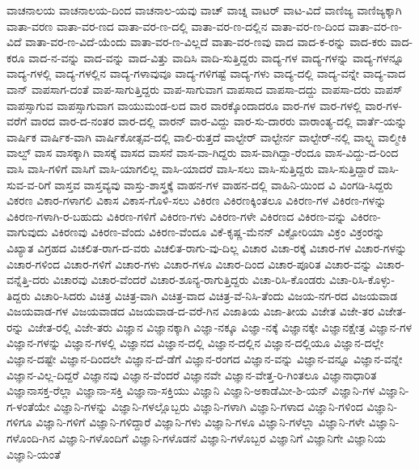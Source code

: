 {ವಾಚನಾಲಯ
ವಾಚನಾಲಯ-ದಿಂದ
ವಾಚನಾಲ-ಯವು
ವಾಚ್
ವಾಚ್ನ
ವಾಟರ್
ವಾಟ-ವಿದೆ
ವಾಣಿಜ್ಯ
ವಾಣಿಜ್ಯಕ್ಕಾಗಿ
ವಾತಾ-ವರಣ
ವಾತಾ-ವರ-ಣದ
ವಾತಾ-ವರ-ಣ-ದಲ್ಲಿ
ವಾತಾ-ವರ-ಣ-ದಲ್ಲಿನ
ವಾತಾ-ವರ-ಣ-ದಿಂದ
ವಾತಾ-ವರ-ಣ-ವಿದೆ
ವಾತಾ-ವರ-ಣ-ವಿದೆ-ಯೆಂದು
ವಾತಾ-ವರ-ಣ-ವಿಲ್ಲದೆ
ವಾತಾ-ವರ-ಣವು
ವಾದ
ವಾದ-ಕ-ರನ್ನು
ವಾದ-ಕರು
ವಾದ-ಕರೂ
ವಾದ-ನ-ವನ್ನು
ವಾದ-ವನ್ನು
ವಾದ-ವಿತ್ತು
ವಾದಿಸಿ
ವಾದಿ-ಸುತ್ತಿದ್ದರು
ವಾದ್ಯ-ಗಳ
ವಾದ್ಯ-ಗಳನ್ನು
ವಾದ್ಯ-ಗಳನ್ನೂ
ವಾದ್ಯ-ಗಳಲ್ಲಿ
ವಾದ್ಯ-ಗಳಲ್ಲಿನ
ವಾದ್ಯ-ಗಳಾವುವೂ
ವಾದ್ಯ-ಗಳಿಗಷ್ಟೆ
ವಾದ್ಯ-ಗಳು
ವಾದ್ಯ-ದಲ್ಲಿ
ವಾದ್ಯ-ವನ್ನೇ
ವಾದ್ಯ-ವಾದ
ವಾನ್
ವಾಪಸಾಗ-ದಂತೆ
ವಾಪ-ಸಾಗುತ್ತಿದ್ದರು
ವಾಪ-ಸಾಗುವಾಗ
ವಾಪಸಾದ
ವಾಪಸಾ-ದದ್ದು
ವಾಪಸಾ-ದರು
ವಾಪಸ್
ವಾಪಸ್ಸಾಗುವ
ವಾಪಸ್ಸಾಗುವಾಗ
ವಾಯುಮಂಡ-ಲದ
ವಾರ
ವಾರಕ್ಕೊಂದಾದರೂ
ವಾರ-ಗಳ
ವಾರ-ಗಳಲ್ಲಿ
ವಾರ-ಗಳ-ವರೆಗೆ
ವಾರದ
ವಾರ-ದ-ನಂತರ
ವಾರ-ದಲ್ಲಿ
ವಾರನ್
ವಾರ-ವಿದ್ದು
ವಾರ-ಸು-ದಾರರು
ವಾರಾಂತ್ಯ-ದಲ್ಲಿ
ವಾರ್ತೆ-ಯನ್ನು
ವಾರ್ಷಿಕ
ವಾರ್ಷಿಕ-ವಾಗಿ
ವಾರ್ಷಿಕೋತ್ಸವ-ದಲ್ಲಿ
ವಾಲಿ-ರುತ್ತದೆ
ವಾಲ್ಟೇರ್
ವಾಲ್ಟೇರ್ನ
ವಾಲ್ಟೇರ್-ನಲ್ಲಿ
ವಾಲ್ಟ್ನ
ವಾಲ್ಮೀಕಿ
ವಾಲ್ವ್
ವಾಸ
ವಾಸಕ್ಕಾಗಿ
ವಾಸಕ್ಕೆ
ವಾಸದ
ವಾಸನೆ
ವಾಸ-ವಾ-ಗಿದ್ದರು
ವಾಸ-ವಾಗಿದ್ದಾ-ರೆಂದೂ
ವಾಸ-ವಿದ್ದು-ದ-ರಿಂದ
ವಾಸಿ
ವಾಸಿ-ಗಳಿಗೆ
ವಾಸಿಗೆ
ವಾಸಿ-ಯಾಗಲಿಲ್ಲ
ವಾಸಿ-ಯಾದರೆ
ವಾಸಿ-ಸಲು
ವಾಸಿ-ಸುತ್ತಿದ್ದರು
ವಾಸಿ-ಸುತ್ತಿದ್ದಾರೆ
ವಾಸಿ-ಸುವ-ವ-ರಿಗೆ
ವಾಸ್ತವ
ವಾಸ್ತವ್ಯವು
ವಾಸ್ತು-ಶಾಸ್ತ್ರಕ್ಕೆ
ವಾಹನ-ಗಳ
ವಾಹನ-ದಲ್ಲಿ
ವಾಹಿನಿ-ಯಿಂದ
ವಿ
ವಿಂಗಡಿ-ಸಿದ್ದರು
ವಿಕರಣ
ವಿಕಾರ-ಗಳಾಗಲಿ
ವಿಕಾಸ
ವಿಕಾಸ-ಗೊಳಿ-ಸಲು
ವಿಕಿರಣ
ವಿಕಿರಣಕ್ಕಿಂತಲೂ
ವಿಕಿರಣ-ಗಳ
ವಿಕಿರಣ-ಗಳನ್ನು
ವಿಕಿರಣ-ಗಳಾಗಿ-ರ-ಬಹುದು
ವಿಕಿರಣ-ಗಳಿಗೆ
ವಿಕಿರಣ-ಗಳು
ವಿಕಿರಣ-ಗಳೇ
ವಿಕಿರಣದ
ವಿಕಿರಣ-ವನ್ನು
ವಿಕಿರಣ-ವಾಗುವುದು
ವಿಕಿರಣವು
ವಿಕಿರಣ-ವೆಂದು
ವಿಕಿರಣ-ವೆಂದೂ
ವಿಕೆ-ಕೃಷ್ಣ-ಮೆನನ್
ವಿಕ್ಟೋರಿಯಾ
ವಿಕ್ರಂ
ವಿಕ್ರಂರನ್ನು
ವಿಖ್ಯಾತ
ವಿಗ್ರಹದ
ವಿಚಲಿತ-ರಾಗ-ದ-ವರು
ವಿಚಲಿತ-ರಾಗು-ವು-ದಿಲ್ಲ
ವಿಚಾರ
ವಿಚಾ-ರಕ್ಕೆ
ವಿಚಾರ-ಗಳ
ವಿಚಾರ-ಗಳನ್ನು
ವಿಚಾರ-ಗಳಿಂದ
ವಿಚಾರ-ಗಳಿಗೆ
ವಿಚಾರ-ಗಳು
ವಿಚಾರ-ಗಳೂ
ವಿಚಾರ-ದಿಂದ
ವಿಚಾರ-ಪೂರಿತ
ವಿಚಾರ-ವನ್ನು
ವಿಚಾರ-ವನ್ನೆತ್ತಿ-ದರು
ವಿಚಾರವು
ವಿಚಾರ-ವೆಂದರೆ
ವಿಚಾರ-ಶೂನ್ಯ-ರಾಗುತ್ತಿದ್ದರು
ವಿಚಾ-ರಿಸಿ-ಕೊಂಡರು
ವಿಚಾ-ರಿಸಿ-ಕೊಳ್ಳು-ತಿದ್ದರು
ವಿಚಾರಿ-ಸಿದರು
ವಿಚಿತ್ರ
ವಿಚಿತ್ರ-ವಾಗಿ
ವಿಚಿತ್ರ-ವಾದ
ವಿಚಿತ್ರ-ವೆ-ನಿಸಿ-ತೆಂದು
ವಿಜಯ-ನಗ-ರದ
ವಿಜಯವಾಡ
ವಿಜಯವಾಡ-ಗಳ
ವಿಜಯವಾಡದ
ವಿಜಯವಾಡ-ದ-ವರೆ-ಗಿನ
ವಿಜಾತಿಯ
ವಿಜಾ-ತೀಯ
ವಿಜೇತ
ವಿಜೇ-ತರ
ವಿಜೇತ-ರನ್ನು
ವಿಜೇತ-ರಲ್ಲಿ
ವಿಜೇ-ತರು
ವಿಜ್ಞಾನ
ವಿಜ್ಞಾನಕ್ಕಾಗಿ
ವಿಜ್ಞಾ-ನಕ್ಕೂ
ವಿಜ್ಞಾ-ನಕ್ಕೆ
ವಿಜ್ಞಾನಕ್ಕೇ
ವಿಜ್ಞಾನಕ್ಷೇತ್ರ
ವಿಜ್ಞಾನ-ಗಳ
ವಿಜ್ಞಾನ-ಗಳನ್ನು
ವಿಜ್ಞಾನ-ಗಳಲ್ಲಿ
ವಿಜ್ಞಾನದ
ವಿಜ್ಞಾನ-ದಲ್ಲಿ
ವಿಜ್ಞಾನ-ದಲ್ಲಿನ
ವಿಜ್ಞಾನ-ದಲ್ಲಿಯೂ
ವಿಜ್ಞಾನ-ದಲ್ಲೇ
ವಿಜ್ಞಾನ-ದಷ್ಟೇ
ವಿಜ್ಞಾನ-ದಿಂದಲೇ
ವಿಜ್ಞಾನ-ದೆ-ಡೆಗೆ
ವಿಜ್ಞಾನ-ರಂಗದ
ವಿಜ್ಞಾನ-ವನ್ನು
ವಿಜ್ಞಾನ-ವನ್ನೂ
ವಿಜ್ಞಾನ-ವನ್ನೇ
ವಿಜ್ಞಾನ-ವಿಲ್ಲ-ದಿದ್ದರೆ
ವಿಜ್ಞಾನವು
ವಿಜ್ಞಾನ-ವೆಂದರೆ
ವಿಜ್ಞಾನವೇ
ವಿಜ್ಞಾನ-ವೇತ್ತ-ರಿ-ಗಿಂತಲೂ
ವಿಜ್ಞಾನಾಧಾರಿತ
ವಿಜ್ಞಾನಾಸಕ್ತ-ರೆಲ್ಲಾ
ವಿಜ್ಞಾನಾ-ಸಕ್ತಿ
ವಿಜ್ಞಾನಾ-ಸಕ್ತಿಯು
ವಿಜ್ಞಾನಿ
ವಿಜ್ಞಾನಿ-ಅಕಾಡೆಮೀ-ಶಿ-ಯನ್
ವಿಜ್ಞಾನಿ-ಗಳ
ವಿಜ್ಞಾನಿ-ಗ-ಳಂತೆಯೇ
ವಿಜ್ಞಾನಿ-ಗಳನ್ನು
ವಿಜ್ಞಾನಿ-ಗಳಲ್ಲೊಬ್ಬರು
ವಿಜ್ಞಾನಿ-ಗಳಾಗಿ
ವಿಜ್ಞಾನಿ-ಗಳಾದ
ವಿಜ್ಞಾನಿ-ಗಳಿಂದ
ವಿಜ್ಞಾನಿ-ಗಳಿಗೂ
ವಿಜ್ಞಾನಿ-ಗಳಿಗೆ
ವಿಜ್ಞಾನಿ-ಗಳಿದ್ದಾರೆ
ವಿಜ್ಞಾನಿ-ಗಳು
ವಿಜ್ಞಾನಿ-ಗಳೂ
ವಿಜ್ಞಾನಿ-ಗಳೆಲ್ಲಾ
ವಿಜ್ಞಾನಿ-ಗಳೇ
ವಿಜ್ಞಾನಿ-ಗಳೊಂದಿ-ಗಿನ
ವಿಜ್ಞಾನಿ-ಗಳೊಂದಿಗೆ
ವಿಜ್ಞಾನಿ-ಗಳೊಡನೆ
ವಿಜ್ಞಾನಿ-ಗಳೊಬ್ಬರ
ವಿಜ್ಞಾನಿಗೆ
ವಿಜ್ಞಾನಿಗೇ
ವಿಜ್ಞಾನಿಯ
ವಿಜ್ಞಾನಿ-ಯಂತೆ
}
